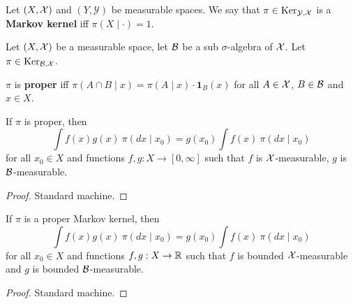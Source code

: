 \begin{definition}
    \label{def:markov-ker}
    \leanok{}

    Let $(X,\mathcal X)$ and $(Y,\mathcal{Y})$ be measurable spaces. We say that $\pi\in\text{Ker}_{\mathcal{Y},\mathcal X}$ is a \textbf{Markov kernel} iff $\pi(X\mid \cdot)=1$.
\end{definition}

Let $(X, \mathcal X)$ be a measurable space, let $\mathcal B$ be a sub $\sigma$-algebra of $\mathcal X$. Let $\pi \in \text{Ker}_{\mathcal B, \mathcal X}$.

\begin{definition}
    \label{def:proper-ker}
    \leanok{}

    $\pi$ is \textbf{proper} iff $\pi(A\cap B\mid x)=\pi(A\mid x)\cdot\mathbf{1}_B(x)$ for all $A\in\mathcal X$, $B\in\mathcal B$ and $x\in X$.
\end{definition}

\begin{lemma}
    \label{lem:proper-ker-lintegral}
    \leanok{}

    If $\pi$ is proper, then
    \[\int f(x) g(x)\ \pi(dx\mid x_0) = g(x_0)\int f(x)\ \pi(dx\mid x_0)\]
    for all $x_0 \in X$ and functions $f, g : X \to [0, \infty]$ such that $f$ is $\mathcal X$-measurable, $g$ is $\mathcal B$-measurable.
\end{lemma}
\begin{proof}
    \leanok{}

    Standard machine.
\end{proof}

\begin{lemma}
    \label{lem:proper-ker-integral}
    \leanok{}

    If $\pi$ is a proper Markov kernel, then
    \[\int f(x) g(x)\ \pi(dx\mid x_0) = g(x_0)\int f(x)\ \pi(dx\mid x_0)\]
    for all $x_0 \in X$ and functions $f, g : X \to \mathbb R$ such that $f$ is bounded $\mathcal X$-measurable and $g$ is bounded $\mathcal B$-measurable.
\end{lemma}
\begin{proof}

    Standard machine.
\end{proof}

